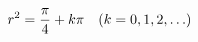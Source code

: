 \documentclass[preview]{standalone}
\begin{document}
\begin{align*}
\special{dvisvgm:raw <g id='unique000'>}r^2=\frac{\pi}{4}+k\pi\quad(k=0,1,2,\ldots)\special{dvisvgm:raw </g>}
\end{align*}
\end{document}
